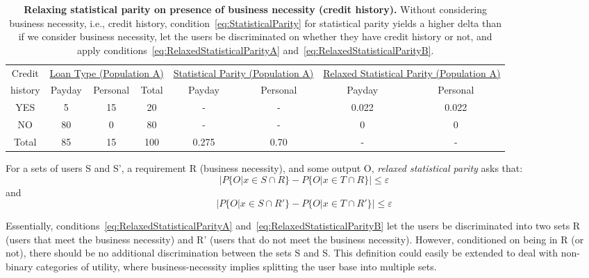 \begin{table*}[t]
{ \small
  \center
  \renewcommand{\arraystretch}{1.5}
  \begin{tabular}{ c | c c c | c c | c c}
    Credit
    & \multicolumn{3}{|c|}{\underline{Loan Type (Population A)}}
    & \multicolumn{2}{|c}{\underline{Statistical Parity (Population A) }}
    & \multicolumn{2}{|c}{\underline{Relaxed Statistical Parity (Population A) }} \\
    history & Payday & Personal & Total & Payday & Personal & Payday & Personal \\
    \hline
    YES & 5  & 15 & 20 & - & - &  0.022 & 0.022 \\
    NO  & 80 & 0  & 80 & - & - &  0    & 0 \\
    \hline
    Total & 85 & 15 & 100 & 0.275 & 0.70 & - & - \\
  \end{tabular}
  \caption{{\bf Relaxing statistical parity on presence of business necessity
    (credit history).}
    Without considering business necessity, i.e., credit history,
    condition~\ref{eq:StatisticalParity} for statistical parity yields a
    higher delta than if we
    consider business necessity, let the users be discriminated on whether
    they have credit
    history or not, and apply conditions~\ref{eq:RelaxedStatisticalParityA}
    and~\ref{eq:RelaxedStatisticalParityB}.
  }
  \label{tab:BusinessNessecityB}
}
\end{table*}
For a sets of users S and S', a requirement R (business necessity), and some
output O, {\em relaxed statistical parity} asks that:
\begin{equation}
|P\{O | x \in S \cap R\} - P\{O | x \in T \cap R\}| \le \varepsilon
\label{eq:RelaxedStatisticalParityA}
\end{equation}
and
\begin{equation}
|P\{O | x \in S \cap R'\} - P\{O | x \in T \cap R'\}| \le \varepsilon
\label{eq:RelaxedStatisticalParityB}
\end{equation}

Essentially, conditions~\ref{eq:RelaxedStatisticalParityA}
and~\ref{eq:RelaxedStatisticalParityB} let the users be discriminated into two
sets R (users that meet the business necessity) and R' (users that do not
meet the business necessity). However, conditioned on being in R (or not),
there should be no additional discrimination between the sets S and S.
This definition
could easily be extended to deal with non-binary categories of utility, where
business-necessity implies splitting the user base into multiple sets.

